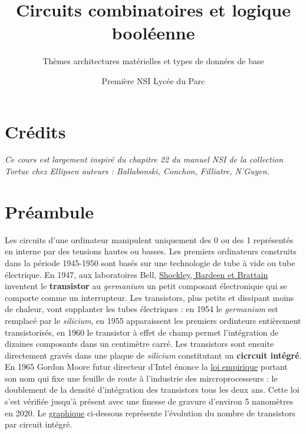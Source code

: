 \documentclass[
  11pt,
]{article}
\title{Circuits combinatoires et logique booléenne}
\subtitle{Thèmes architectures matérielles et types de données de base}
\author{Première NSI Lycée du Parc}
\date{}
\newcounter{cours}
\newcounter{logi}
\begin{document}
\maketitle

\renewcommand*\contentsname{Table des matières}
{
\hypersetup{linkcolor=}
\setcounter{tocdepth}{3}
\tableofcontents
}
\hypertarget{cruxe9dits}{%
\section*{Crédits}\label{cruxe9dits}}

\emph{Ce cours est largement inspiré du chapitre 22 du manuel NSI de la
collection Tortue chez Ellipsen auteurs : Ballabonski, Conchon,
Filliatre, N'Guyen.}

\hypertarget{pruxe9ambule}{%
\section*{Préambule}\label{pruxe9ambule}}

Les circuits d'une ordinateur manipulent uniquement des 0 ou des 1
représentés en interne par des tensions hautes ou basses. Les premiers
ordinateurs construits dans la période 1945-1950 sont basés sur une
technologie de tube à vide ou tube électrique. En 1947, aux laboratoires
Bell, \href{https://fr.wikipedia.org/wiki/Transistor}{Shockley, Bardeen
et Brattain} inventent le \textbf{transistor} au \emph{germanium} un
petit composant électronique qui se comporte comme un interrupteur. Les
transistors, plus petits et dissipant moins de chaleur, vont supplanter
les tubes électriques : en 1954 le \emph{germanium} est remplacé par le
\emph{silicium}, en 1955 apparaissent les premiers ordinteurs
entièrement transistorisés, en 1960 le transistor à effet de champ
permet l'intégration de dizaines composants dans un centimètre carré.
Les transistors sont ensuite directement gravés dans une plaque de
\emph{silicium} constitutant un \textbf{cicrcuit intégré}. En 1965
Gordon Moore futur directeur d'Intel énonce la
\href{https://fr.wikipedia.org/wiki/Loi_de_Moore}{loi empirique} portant
son nom qui fixe une feuille de route à l'industrie des
mircroprocesseurs : le doublement de la densité d'intégration des
transistors tous les deux ans. Cette loi s'est vérifiée jusqu'à présent
avec une finesse de gravure d'environ 5 nanomètres en 2020. Le
\href{https://en.wikipedia.org/wiki/Moore\%27s_law\#/media/File:Moore's_Law_Transistor_Count_1971-2018.png}{graphique}
ci-dessous représente l'évolution du nombre de transistors par circuit
intégré.
\end{document}
